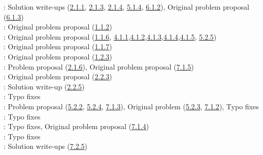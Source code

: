 \Paiya: Solution write-ups (\hyperref[2-1-1]{2.1.1}, \hyperref[2-1-3]{2.1.3}, \hyperref[2-1-4]{2.1.4}, \hyperref[5-1-4]{5.1.4}, \hyperref[6-1-2]{6.1.2}), Original problem proposal (\hyperref[6-1-3]{6.1.3}) \\
\Ptony: Original problem proposal (\hyperref[1-1-2]{1.1.2})\\
\Ppi: Original problem proposal (\hyperref[1-1-6]{1.1.6}, \hyperref[4-1-1]{4.1.1},\hyperref[4-1-2]{4.1.2},\hyperref[4-1-3]{4.1.3},\hyperref[4-1-4]{4.1.4},\hyperref[4-1-5]{4.1.5}, \hyperref[5-2-5]{5.2.5})\\
\Pbfan: Original problem proposal (\hyperref[1-1-7]{1.1.7})\\
\Pkiesh: Original problem proposal (\hyperref[1-2-3]{1.2.3})\\
\Pchris: Problem proposal (\hyperref[2-1-6]{2.1.6}), Original problem proposal (\hyperref[7-1-5]{7.1.5})\\
\Pkee: Original problem proposal (\hyperref[2-2-3]{2.2.3})\\
\PSlas: Solution write-up (\hyperref[2-2-5]{2.2.5})\\
\Parjun: Typo fixes\\
\Pnjoy: Problem proposal (\hyperref[5-2-2]{5.2.2}, \hyperref[5-2-4]{5.2.4}, \hyperref[7-1-3]{7.1.3}), Original problem (\hyperref[5-2-3]{5.2.3}, \hyperref[7-1-2]{7.1.2}), Typo fixes\\
\Paops: Typo fixes\\
\Phobo: Typo fixes, Original problem proposal (\hyperref[7-1-4]{7.1.4})\\
\Pradical: Typo fixes\\
\Prishi: Solution write-ups (\hyperref[7-2-5]{7.2.5})\\
